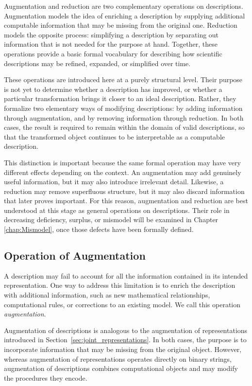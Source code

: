 Augmentation and reduction are two complementary operations on descriptions. Augmentation models the idea of enriching a description by supplying additional computable information that may be missing from the original one. Reduction models the opposite process: simplifying a description by separating out information that is not needed for the purpose at hand. Together, these operations provide a basic formal vocabulary for describing how scientific descriptions may be refined, expanded, or simplified over time.

These operations are introduced here at a purely structural level. Their purpose is not yet to determine whether a description has improved, or whether a particular transformation brings it closer to an ideal description. Rather, they formalize two elementary ways of modifying descriptions: by adding information through augmentation, and by removing information through reduction. In both cases, the result is required to remain within the domain of valid descriptions, so that the transformed object continues to be interpretable as a computable description.

This distinction is important because the same formal operation may have very different effects depending on the context. An augmentation may add genuinely useful information, but it may also introduce irrelevant detail. Likewise, a reduction may remove superfluous structure, but it may also discard information that later proves important. For this reason, augmentation and reduction are best understood at this stage as general operations on descriptions. Their role in decreasing deficiency, surplus, or mismodel will be examined in Chapter \ref{chap:Mismodel}, once those defects have been formally defined.


\subsection*{Operation of Augmentation}

A description may fail to account for all the information contained in its intended representation. One way to address this limitation is to enrich the description with additional information, such as new mathematical relationships, computational rules, or corrections to an existing model. We call this operation \emph{augmentation}.

Augmentation of descriptions is analogous to the augmentation of representations introduced in Section~\ref{sec:joint_representations}. In both cases, the purpose is to incorporate information that may be missing from the original object. However, whereas augmentation of representations operates directly on binary strings, augmentation of descriptions combines computational objects and may modify the procedures they encode.

